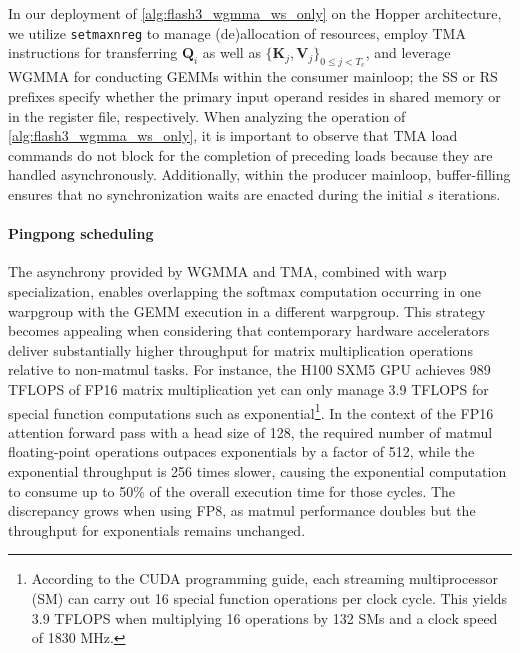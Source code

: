 \begin{enumerate}
In our deployment of \cref{alg:flash3_wgmma_ws_only} on the Hopper architecture, we utilize \verb|setmaxnreg| to manage (de)allocation of resources, employ TMA instructions for transferring $\mathbf{Q}_i$ as well as $\{ \mathbf{K}_j, \mathbf{V}_j \}_{0 \leq j < T_c}$, and leverage WGMMA for conducting GEMMs within the consumer mainloop; the SS or RS prefixes specify whether the primary input operand resides in shared memory or in the register file, respectively. When analyzing the operation of \cref{alg:flash3_wgmma_ws_only}, it is important to observe that TMA load commands do not block for the completion of preceding loads because they are handled asynchronously. Additionally, within the producer mainloop, buffer-filling ensures that no synchronization waits are enacted during the initial $s$ iterations.

\paragraph{Pingpong scheduling} The asynchrony provided by WGMMA and TMA, combined with warp specialization, enables overlapping the softmax computation occurring in one warpgroup with the GEMM execution in a different warpgroup. This strategy becomes appealing when considering that contemporary hardware accelerators deliver substantially higher throughput for matrix multiplication operations relative to non-matmul tasks. For instance, the H100 SXM5 GPU achieves 989 TFLOPS of FP16 matrix multiplication yet can only manage 3.9 TFLOPS for special function computations such as exponential\footnote{According to the CUDA programming guide, each streaming multiprocessor (SM) can carry out 16 special function operations per clock cycle. This yields 3.9 TFLOPS when multiplying 16 operations by 132 SMs and a clock speed of 1830 MHz.}. In the context of the FP16 attention forward pass with a head size of 128, the required number of matmul floating-point operations outpaces exponentials by a factor of 512, while the exponential throughput is 256 times slower, causing the exponential computation to consume up to 50\% of the overall execution time for those cycles. The discrepancy grows when using FP8, as matmul performance doubles but the throughput for exponentials remains unchanged.


\end{enumerate}
